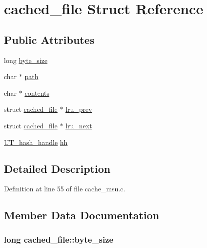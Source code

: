 \hypertarget{structcached__file}{\section{cached\-\_\-file Struct Reference}
\label{structcached__file}
}
\subsection*{Public Attributes}
\begin{DoxyCompactItemize}
\item 
long \hyperlink{structcached__file_ab341d83780bc8fdc7362ebac8867169f}{byte\-\_\-size}
\item 
char $\ast$ \hyperlink{structcached__file_ad365c05408e61278455735c5a3725238}{path}
\item 
char $\ast$ \hyperlink{structcached__file_a67ba78812dfaec45ea673e5639298433}{contents}
\item 
struct \hyperlink{structcached__file}{cached\-\_\-file} $\ast$ \hyperlink{structcached__file_a4810ee4ad0b3824be5889b86d10a0228}{lru\-\_\-prev}
\item 
struct \hyperlink{structcached__file}{cached\-\_\-file} $\ast$ \hyperlink{structcached__file_abb94a23f7568cd1f1a3cce482a0f6e5a}{lru\-\_\-next}
\item 
\hyperlink{struct_u_t__hash__handle}{U\-T\-\_\-hash\-\_\-handle} \hyperlink{structcached__file_aa1a906a42d707b0c7ce4a479ca6536a9}{hh}
\end{DoxyCompactItemize}


\subsection{Detailed Description}


Definition at line 55 of file cache\-\_\-msu.\-c.



\subsection{Member Data Documentation}
\hypertarget{structcached__file_ab341d83780bc8fdc7362ebac8867169f}{
\subsubsection[{byte\-\_\-size}]{\setlength{\rightskip}{0pt plus 5cm}long cached\-\_\-file\-::byte\-\_\-size}}\label{structcached__file_ab341d83780bc8fdc7362ebac8867169f}


